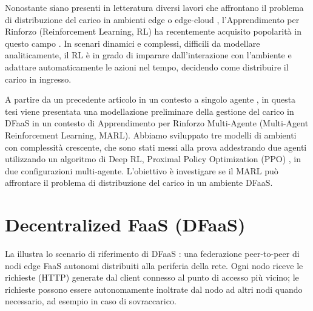 \documentclass[a4paper, twocolumn]{article}
\begin{document}
Nonostante siano presenti in letteratura diversi lavori che affrontano il problema di distribuzione del carico in ambienti edge o edge-cloud \cite{Hsieh2023}, l'Apprendimento per Rinforzo (Reinforcement Learning, RL) ha recentemente acquisito popolarità in questo campo \cite{Hortelano2023}. In scenari dinamici e complessi, difficili da modellare analiticamente, il RL è in grado di imparare dall'interazione con l'ambiente e adattare automaticamente le azioni nel tempo, decidendo come distribuire il carico in ingresso.

A partire da un precedente articolo in un contesto a singolo agente \cite{Petriglia2024}, in questa tesi viene presentata una modellazione preliminare della gestione del carico in DFaaS in un contesto di Apprendimento per Rinforzo Multi-Agente (Multi-Agent Reinforcement Learning, MARL). Abbiamo sviluppato tre modelli di ambienti con complessità crescente, che sono stati messi alla prova addestrando due agenti utilizzando un algoritmo di Deep RL, Proximal Policy Optimization (PPO) \cite{Schulman2017}, in due configurazioni multi-agente. L'obiettivo è investigare se il MARL può affrontare il problema di distribuzione del carico in un ambiente DFaaS.

\section{Decentralized FaaS (DFaaS)}

La  illustra lo scenario di riferimento di DFaaS \cite{Ciavotta2021}: una federazione peer-to-peer di nodi edge FaaS autonomi distribuiti alla periferia della rete. Ogni nodo riceve le richieste (HTTP) generate dal client connesso al punto di accesso più vicino; le richieste possono essere autonomamente inoltrate dal nodo ad altri nodi quando necessario, ad esempio in caso di sovraccarico.
\end{document}

